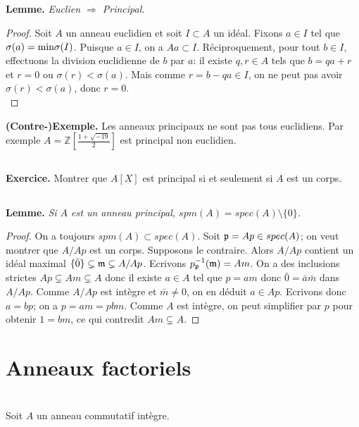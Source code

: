 \documentclass[a4paper, 12pt]{amsart}
\newcommand{\Z}{\mathbb{Z}}
\begin{document}
 

\subsection{ }\hspace{-0.cm}\label{EuclIsPrinc}\textbf{Lemme.} \textit{Euclien $\Rightarrow$ Principal.} 
 
 \begin{proof} Soit $A$ un anneau euclidien et soit $I\subset A$ un idéal. Fixons $a\in I$ tel que $\sigma(a)=\hbox{\rm min}\sigma(I)$. Puisque $a\in I$, on a $Aa\subset I$. Réciproquement, pour tout $b\in I$, effectuons la division euclidienne de $b$ par $a$: il existe $q,r\in A$ tels que $b=qa+r$ et $r=0$ ou $\sigma(r)<\sigma(a)$. Mais comme $r=b-qa\in I$, on ne peut pas avoir $\sigma(r)<\sigma(a)$, donc $r=0$.\\
 \end{proof}
 
 \noindent\textbf{(Contre-)Exemple.} Les anneaux principaux ne sont pas tous euclidiens. Par exemple  $A=\Z[\frac{1+\sqrt{-19}}{2}]$ est principal non euclidien.\\
 
 \subsection{}\textbf{Exercice.} Montrer que $A[X]$ est principal si et seulement si $A$ est un corps. 
  \subsection{}\textbf{Lemme.} \textit{Si $A$ est un anneau principal, $spm(A)=spec(A)\setminus \lbrace 0\rbrace$.}
  
  \begin{proof} On a toujours $spm(A)\subset spec(A)$. Soit $\frak{p}=Ap\in spec(A)$; on veut montrer que $A/Ap$ est un corps. Supposons le contraire. Alors $A/Ap$ contient un idéal maximal $\lbrace \bar{0}\rbrace\subsetneq\frak{m}\subsetneq A/Ap$. Ecrivons $p_{\frak{p}}^{-1}(\frak{m})=Am$. On a des inclusions strictes  $Ap\subsetneq Am\subsetneq A$ donc il existe $a\in A$ tel que $p=am$ donc $\bar{0}=\bar{a}\bar{m}$ dans $A/Ap$. Comme $A/Ap$ est intègre et $\bar{m}\not= 0$, on en déduit $a\in Ap$. Ecrivons donc $a=bp$; on a $p=am=pbm$. Comme $A$ est intègre, on peut simplifier par $p$ pour obtenir $1=bm$, ce qui contredit $ Am\subsetneq A$.   \end{proof}
 \section{Anneaux factoriels}\label{Factoriel} \textit{}\\
 \noindent Soit $A$ un anneau commutatif intègre. \\
 
\end{document}
